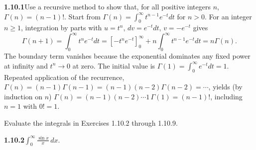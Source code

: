 \par\bigskip
\noindent\textbf{1.10.1}\quad Use a recursive method to show that, for all
positive integers $n$, $\Gamma(n)=(n-1)!$.
\solution
Start from $\Gamma(n)=\int_0^\infty t^{n-1}e^{-t}dt$ for $n>0$.
For an integer $n\ge1$, integration by parts with $u=t^n$,
$dv=e^{-t}dt$, $v=-e^{-t}$ gives
\[
 \Gamma(n+1)=\int_0^\infty t^n e^{-t}dt
 =[-t^n e^{-t}]_0^\infty+n\int_0^\infty t^{n-1}e^{-t}dt
 =n\Gamma(n).
\]
The boundary term vanishes because the exponential dominates any fixed
power at infinity and $t^n\to0$ at zero. The initial value is
$\Gamma(1)=\int_0^\infty e^{-t}dt=1$. Repeated application of the
recurrence, $\Gamma(n)=(n-1)\Gamma(n-1)=(n-1)(n-2)\Gamma(n-2)=\cdots$,
yields (by induction on $n$) $\Gamma(n)=(n-1)(n-2)\cdots1\,\Gamma(1)
=\boxed{(n-1)!}$, including $n=1$ with $0!=1$.


\par\bigskip
\noindent Evaluate the integrals in Exercises 1.10.2 through 1.10.9.

\par\bigskip
\noindent\textbf{1.10.2}\quad $\displaystyle\int_{0}^{\infty}\frac{\sin x}{x}\,dx$.

